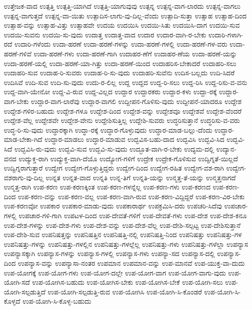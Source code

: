 {ಉತ್ತೇಜಕ-ವಾದ
ಉತ್ಪತ್ತಿ
ಉತ್ಪತ್ತಿ-ಯಾಗಿದೆ
ಉತ್ಪತ್ತಿ-ಯಾಗುವುವು
ಉತ್ಪನ್ನ
ಉತ್ಪನ್ನ-ವಾಗ-ಲಾರದು
ಉತ್ಪನ್ನ-ವಾಗಲು
ಉತ್ಪನ್ನ-ವಾಗುತ್ತದೆ
ಉತ್ಪನ್ನ-ವಾ-ಯಿತು
ಉತ್ಪಾದಿಸ-ಲಾಗು-ವು-ದಿಲ್ಲ-ವೆಂದು
ಉತ್ಪಾದಿ-ಸುತ್ತಾ
ಉತ್ಸಾಹ
ಉತ್ಸಾಹ-ದಿಂದ
ಉತ್ಸಾಹ-ವನ್ನು
ಉತ್ಸಾಹ-ವಿತ್ತು
ಉತ್ಸಾಹವೇ
ಉದಯ
ಉದಯಿಸಿ
ಉದಯಿ-ಸಿತು
ಉದಯಿಸಿ-ದಾಗ
ಉದಯಿ-ಸುವ
ಉದಯಿ-ಸುವನು
ಉದಯಿ-ಸು-ವುದು
ಉದಾತ್ತ
ಉದಾತ್ತ-ವಾದ
ಉದಾರ
ಉದಾರ-ವಾಗಿ-ರ-ಬೇಕು
ಉದಾರಿ-ಗಳಾಗಿ-ರದೆ
ಉದಾರಿ-ಗಳೆಂದು
ಉದಾ-ಹರಣೆ
ಉದಾ-ಹರಣೆ-ಗಳನ್ನು
ಉದಾ-ಹರಣೆ-ಗಳಲ್ಲಿ
ಉದಾ-ಹರಣೆ-ಗಳ-ವರು
ಉದಾ-ಹರಣೆ-ಗಳಿವೆ
ಉದಾ-ಹರಣೆ-ಗಳು
ಉದಾ-ಹರಣೆ-ಗಾಗಿ
ಉದಾಹರ-ಣೆಗೆ
ಉದಾಹರ-ಣೆಯ
ಉದಾ-ಹರಣೆ-ಯನ್ನು
ಉದಾ-ಹರಣೆ-ಯಲ್ಲಿ
ಉದಾ-ಹರಣೆ-ಯಾ-ಗಿತ್ತು
ಉದಾ-ಹರಣೆ-ಯಿಂದ
ಉದಾಹರಿಸ-ಬೇಕಾದರೆ
ಉದಾಹರಿ-ಸಲು
ಉದಾಹರಿ-ಸುವ
ಉದಾಹ-ರಿ-ಸುವರು
ಉದಾಹ-ರಿ-ಸು-ವುದು
ಉದಾಹರಿ-ಸುವೆನು
ಉದಿಸ-ಬಲ್ಲದು
ಉದಿ-ಸಿದರೆ
ಉದಿಸಿವೆ
ಉದಿ-ಸುವ
ಉದಿ-ಸು-ವುದು
ಉದು-ರ-ಲಿಲ್ಲ
ಉದ್ದ
ಉದ್ದದ
ಉದ್ದ-ರಿ-ಸಲು
ಉದ್ದ-ರಿಸಿ
ಉದ್ದ-ರಿಸು-ವ-ವನು
ಉದ್ದ-ವಾಗಿ-ಯೇನೋ
ಉದ್ದ-ವಿ-ರುವ
ಉದ್ದ-ವಿಲ್ಲದ
ಉದ್ದಾರ
ಉದ್ದಾರಕರು
ಉದ್ದಾರ-ಕಳು
ಉದ್ದಾ-ರಕ್ಕೆ
ಉದ್ದಾರ-ವಾಗ-ಬೇಕು
ಉದ್ದಾರ-ವಾಗ-ಲಾರೆವು
ಉದ್ದಾರ-ವಾಗಲಿ
ಉದ್ದೀಪನ-ಗೊಳಿಸು-ವುದು
ಉದ್ದೀಪನೆ-ಯಾದರೂ
ಉದ್ದೇಶ
ಉದ್ದೇಶ-ಗಳಿರ-ಬಹುದು
ಉದ್ದೇಶ-ಗಳೂ
ಉದ್ದೇಶ-ದಿಂದ
ಉದ್ದೇಶ-ವನ್ನು
ಉದ್ದೇಶವೂ
ಉದ್ದೇಶವೆ
ಉದ್ದೇಶ-ವೆಂದರೆ
ಉದ್ದೇಶ-ವೆಲ್ಲ
ಉದ್ದೇಶವೇ
ಉದ್ದೇಶ-ವೇನು
ಉದ್ದೇಶಿಸುತ್ತಿಲ್ಲ
ಉದ್ದೇಶಿ-ಸುವರು
ಉದ್ಧರಿಸುತ್ತಾನೆ
ಉದ್ಧರಿಸು-ವ-ವರು
ಉದ್ಧ-ರಿ-ಸು-ವುದು
ಉದ್ಧಾರಕ್ಕಾಗಿ
ಉದ್ಧಾ-ರಕ್ಕೆ
ಉದ್ಧಾರ-ಗೊಳ್ಳುವುದು
ಉದ್ಧಾರ-ಮಾಡ-ಬಲ್ಲು-ದೆಂದು
ಉದ್ಧಾರ-ಮಾಡ-ಬೇಕಾ-ಗಿದೆ
ಉದ್ಧಾರ-ಮಾಡಲು
ಉದ್ಧಾರ-ಮಾಡುವ
ಉದ್ಭವಿಸ-ಬಹು-ದಾದ
ಉದ್ಭವಿಸಿ
ಉದ್ಭವಿ-ಸಿದ
ಉದ್ಭವಿ-ಸಿದೆ
ಉದ್ಭವಿಸಿ-ರು-ವುದು
ಉದ್ಭವಿ-ಸುವ
ಉದ್ಭವಿ-ಸು-ವುದು
ಉದ್ಭೂತ-ವಾಗಿ-ರ-ಬೇಕು
ಉದ್ಯಮ-ದಲ್ಲಿ
ಉದ್ಯಾನ-ವನದ
ಉದ್ಯುಕ್ತ-ರಾಗಿ
ಉದ್ಯುಕ್ತ-ವಾಗಿ-ದೆಯೊ
ಉದ್ಯೋಗ-ಗಳಿಗೆ
ಉದ್ರೇಕ
ಉದ್ರೇಕ-ಗೊಳಿಸುವ
ಉದ್ವಿಗ್ನತೆ-ಯಿಲ್ಲದೆ
ಉದ್ವಿಗ್ನರಾಗುತ್ತಾರೆ
ಉದ್ವೇಗ
ಉದ್ವೇಗ-ಗೊಳ್ಳುತ್ತಿದ್ದರು
ಉದ್ವೇಗ-ದಿಂದ
ಉದ್ವೇಗ-ರಹಿತ
ಉದ್ವೇಗ-ವಶ-ರಾಗಿ
ಉದ್ವೇಗ-ವಶರಾಗು-ವು-ದಿಲ್ಲ
ಉನ್ನತ
ಉನ್ನತ-ವಾದ
ಉನ್ನತಿ
ಉನ್ನ-ತಿಗೆ
ಉನ್ನತಿ-ಯನ್ನು
ಉನ್ಮತ್ತ-ತೆ-ಯನ್ನು
ಉನ್ಮತ್ತನಾಗದೆ
ಉನ್ಮತ್ತ-ರಾಗಿ
ಉಪ-ಕರಣ
ಉಪ-ಕರಣಕ್ಕಿಂತ
ಉಪ-ಕರಣ-ಗಳನ್ನೆಲ್ಲ
ಉಪ-ಕರಣ-ಗಳು
ಉಪ-ಕರಣದ
ಉಪ-ಕರಣ-ದಿಂದ
ಉಪ-ಕರಣ-ವನ್ನು
ಉಪ-ಕರಣ-ವಲ್ಲ
ಉಪ-ಕರಣ-ವಾಗಿ-ರುವ
ಉಪ-ಕರಣ-ವಿದ್ದಿದ್ದರೆ
ಉಪ-ಕರಣ-ವಿರ-ಬೇಕು
ಉಪ-ಕರಣವೋ
ಉಪಕಾರ
ಉಪಕಾರ-ಮಾಡು-ವುದು
ಉಪಕಾರಾರ್ಥ
ಉಪಕ್ರಮಿಸಿ-ದರು
ಉಪಚರಿ-ಸಿದೆವು
ಉಪಚಾರ-ಗಳಲ್ಲಿ
ಉಪಚಾರ-ಗಳಿ-ಗಾಗಿ
ಉಪಟಳ-ದಿಂದ
ಉಪ-ದೇವತೆ-ಗಳಿಗೆ
ಉಪ-ದೇವತೆ-ಗಳು
ಉಪ-ದೇಶ
ಉಪ-ದೇಶ-ಕನೂ
ಉಪ-ದೇಶ-ಗಳನ್ನು
ಉಪ-ದೇಶ-ಗಳು
ಉಪ-ದೇಶ-ವನ್ನು
ಉಪ-ದೇಶ-ವೆಲ್ಲ
ಉಪ-ದೇಶಿ-ಸಲ್ಪಟ್ಟ
ಉಪ-ದೇಶಿಸುತ್ತಾನೆ
ಉಪ-ದೇಶಿ-ಸುವ
ಉಪನಿಷತ್ತನ್ನು
ಉಪನಿಷತ್ತಿನ
ಉಪನಿಷತ್ತಿ-ನಲ್ಲಿ
ಉಪನಿಷತ್ತಿ-ನಿಂದ
ಉಪನಿಷತ್ತು
ಉಪನಿಷತ್ತು-ಗಳ
ಉಪನಿಷತ್ತು-ಗಳನ್ನು
ಉಪನಿಷತ್ತು-ಗಳಲ್ಲಿನ
ಉಪನಿಷತ್ತು-ಗಳಲ್ಲೆಲ್ಲ
ಉಪನಿಷತ್ತು-ಗಳು
ಉಪನಿಷತ್ತು-ಗಳೆಲ್ಲಾ
ಉಪನ್ಯಾಸ
ಉಪನ್ಯಾಸಕ್ಕಾಗಿ
ಉಪನ್ಯಾಸ-ಗಳನ್ನು
ಉಪನ್ಯಾಸ-ಗಳಲ್ಲಿ
ಉಪನ್ಯಾಸ-ಗಳು
ಉಪನ್ಯಾ-ಸದ
ಉಪನ್ಯಾಸ-ದಲ್ಲಿ
ಉಪನ್ಯಾಸ-ದಿಂದ
ಉಪನ್ಯಾಸ-ವನ್ನು
ಉಪನ್ಯಾಸಾ-ನಂತರ
ಉಪಮಾನ
ಉಪಮಾನ-ವನ್ನು
ಉಪ-ಮಾನವೆ
ಉಪ-ಯುಕ್ತ-ವಾ-ದುದು
ಉಪ-ಯೋಗಕ್ಕೆ
ಉಪ-ಯೋಗ-ಗಳು
ಉಪ-ಯೋಗ-ದಲ್ಲೇ
ಉಪ-ಯೋಗ-ವಾಗ
ಉಪ-ಯೋಗ-ವಾಗು-ವುದು
ಉಪ-ಯೋಗಿ-ಸದೆ
ಉಪ-ಯೋಗಿಸ-ಬಹುದು
ಉಪ-ಯೋಗಿಸ-ಬೇಕು
ಉಪ-ಯೋಗಿಸ-ಬೇಕೆ
ಉಪ-ಯೋಗಿ-ಸಲು
ಉಪ-ಯೋಗಿ-ಸಲ್ಪಡುತ್ತಿದೆ
ಉಪ-ಯೋಗಿ-ಸಲ್ಪಡುತ್ತಿ-ರುವ
ಉಪ-ಯೋಗಿಸಿ
ಉಪ-ಯೋಗಿ-ಸಿ-ಕೊಂಡರೆ
ಉಪ-ಯೋಗಿ-ಸಿ-ಕೊಳ್ಳದೆ
ಉಪ-ಯೋಗಿ-ಸಿ-ಕೊಳ್ಳ-ಬಹುದು
}
